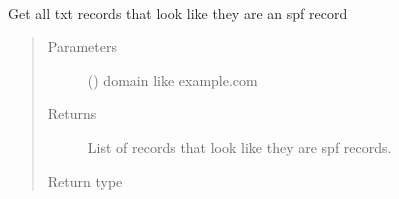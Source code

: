 \documentclass[a4paper,10pt,english,openany,oneside]{sphinxmanual}
\begin{document}
\begin{fulllineitems}
\label{\detokenize{functions:sdvalidator.pull_spf}}~
\begin{sphinxVerbatim}[commandchars=\\\{\}]
\end{sphinxVerbatim}

Get all txt records that look like they are an spf record
\begin{quote}\begin{description}
\item[{Parameters}] \leavevmode
{} () \textendash{} domain like example.com

\item[{Returns}] \leavevmode
List of records that look like they are spf records.

\item[{Return type}] \leavevmode
{}

\end{description}\end{quote}

\end{fulllineitems}

\end{document}
